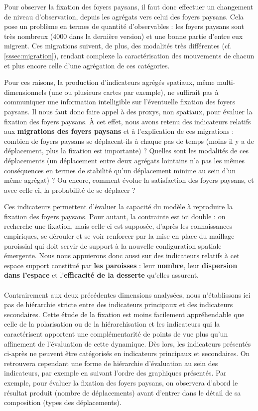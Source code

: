 Pour observer la fixation des foyers paysans, il faut donc effectuer un changement de niveau d'observation, depuis les agrégats vers celui des foyers paysans.
Cela pose un problème en termes de quantité d'observables :
les foyers paysans sont très nombreux (4000 dans la dernière version) et une bonne partie d'entre eux migrent.
Ces migrations suivent, de plus, des modalités très différentes (cf. \cref{sssec:migration}), rendant complexe la caractérisation des mouvements de chacun et plus encore celle d'une agrégation de ces catégories.

Pour ces raisons, la production d'indicateurs agrégés spatiaux, même multi-dimensionnels (une ou plusieurs cartes par exemple), ne suffirait pas à communiquer une information intelligible sur l'éventuelle fixation des foyers paysans.
Il nous faut donc faire appel à des \og proxys\fg{}, non spatiaux, pour évaluer la fixation des foyers paysans.
À cet effet, nous avons retenu des indicateurs relatifs aux \textbf{migrations des foyers paysans} et à l'explication de ces migrations :
combien de foyers paysans se déplacent-ils à chaque pas de temps (moins il y a de déplacement, plus la fixation est importante) ?
Quelles sont les modalités de ces déplacements (un déplacement entre deux agrégats lointains n'a pas les mêmes conséquences en termes de stabilité qu'un déplacement minime au sein d'un même agrégat) ?
Ou encore, comment évolue la satisfaction des foyers paysans, et avec celle-ci, la probabilité de se déplacer ?

Ces indicateurs permettent d'évaluer la capacité du modèle à reproduire la fixation des foyers paysans.
Pour autant, la contrainte est ici double :
on recherche une fixation, mais celle-ci est supposée, d'après les connaissances empiriques, se dérouler et se voir renforcer par la mise en place du maillage paroissial qui doit servir de support à la nouvelle configuration spatiale émergente.
Nous nous appuierons donc aussi sur des indicateurs relatifs à cet espace support constitué par \textbf{les paroisses} :
leur \textbf{nombre}, leur \textbf{dispersion dans l'espace} et l'\textbf{efficacité de la desserte} qu'elles assurent.

\paragraph*{}
Contrairement aux deux précédentes dimensions analysées, nous n'établissons ici pas de hiérarchie stricte entre des indicateurs principaux et des indicateurs secondaires.
Cette étude de la fixation est moins facilement appréhendable que celle de la polarisation ou de la hiérarchisation et les indicateurs qui la caractérisent apportent une complémentarité de points de vue plus qu'un affinement de l'évaluation de cette dynamique.
Dès lors, les indicateurs présentés ci-après ne peuvent être catégorisés en indicateurs principaux et secondaires.
On retrouvera cependant une forme de hiérarchie d'évaluation au sein des indicateurs, par exemple en suivant l'ordre des graphiques présentés.
Par exemple, pour évaluer la fixation des foyers paysans, on observera d'abord le résultat produit (nombre de déplacements) avant d'entrer dans le détail de sa composition (types des déplacements).

